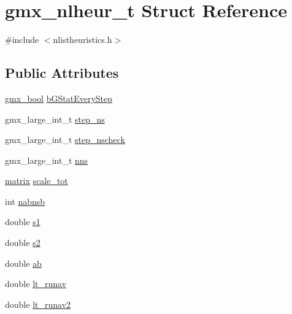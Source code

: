 \hypertarget{structgmx__nlheur__t}{\section{gmx\-\_\-nlheur\-\_\-t \-Struct \-Reference}
\label{structgmx__nlheur__t}
}


{\ttfamily \#include $<$nlistheuristics.\-h$>$}

\subsection*{\-Public \-Attributes}
\begin{DoxyCompactItemize}
\item 
\hyperlink{include_2types_2simple_8h_a8fddad319f226e856400d190198d5151}{gmx\-\_\-bool} \hyperlink{structgmx__nlheur__t_a4b4c8dc2e3617b20f01fae5deb8b57bd}{b\-G\-Stat\-Every\-Step}
\item 
gmx\-\_\-large\-\_\-int\-\_\-t \hyperlink{structgmx__nlheur__t_ac78d6cf4dd7c900ae4a37c7784aa02c2}{step\-\_\-ns}
\item 
gmx\-\_\-large\-\_\-int\-\_\-t \hyperlink{structgmx__nlheur__t_ad4e72c22a0f88f77e74c70a4ad19021b}{step\-\_\-nscheck}
\item 
gmx\-\_\-large\-\_\-int\-\_\-t \hyperlink{structgmx__nlheur__t_a6ca395a6fad0ed4b40fe26db5a115abd}{nns}
\item 
\hyperlink{share_2template_2gromacs_2types_2simple_8h_a7ea9c2a830d3f743b887387e33645a83}{matrix} \hyperlink{structgmx__nlheur__t_ab25bda975de83b396fbbb6c79e7e4fd0}{scale\-\_\-tot}
\item 
int \hyperlink{structgmx__nlheur__t_ad30a509eda22d65704c87f95df3950ac}{nabnsb}
\item 
double \hyperlink{structgmx__nlheur__t_a8ad1632e987664f5aade86b062662761}{s1}
\item 
double \hyperlink{structgmx__nlheur__t_acc5859c678775edfddf5eac3de1090fa}{s2}
\item 
double \hyperlink{structgmx__nlheur__t_ab84963ea84886b7315685fb3b0b361ca}{ab}
\item 
double \hyperlink{structgmx__nlheur__t_af5fa925bfd648d5e388cc040952a58cf}{lt\-\_\-runav}
\item 
double \hyperlink{structgmx__nlheur__t_a77cfc4c205486b31e693bf87e32f5fc2}{lt\-\_\-runav2}
\end{DoxyCompactItemize}


